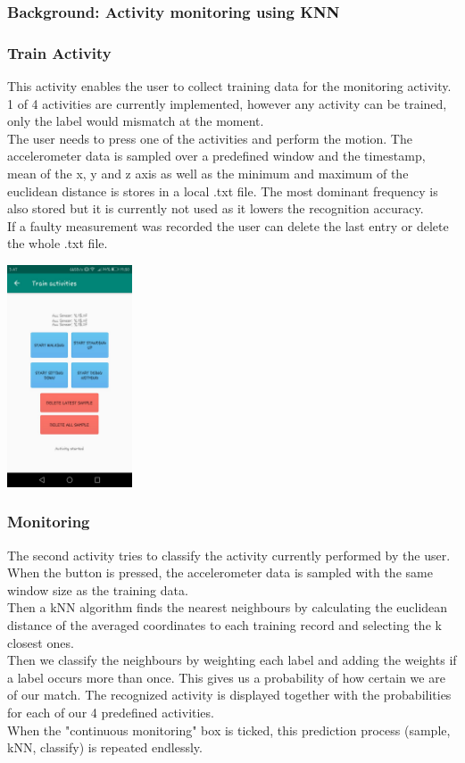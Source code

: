 \documentclass[12pt]{article}
\begin{document}
\subsubsection{Background: Activity monitoring using KNN}

\subsubsection{Train Activity}
This activity enables the user to collect training data for the monitoring activity. 1 of 4 activities are currently implemented, however any activity can be trained, only the label would mismatch at the moment.
\\
The user needs to press one of the activities and perform the motion. The accelerometer data is sampled over a predefined window and the timestamp, mean of the x, y and z axis as well as the minimum and maximum of the euclidean distance is stores in a local .txt file. The most dominant frequency is also stored but it is currently not used as it lowers the recognition accuracy.
\\
If a faulty measurement was recorded the user can delete the last entry or delete the whole .txt file.

\begin{center}
  \includegraphics[width=140px]{images/train_activity}
\end{center}

\pagebreak

\subsubsection{Monitoring}


The second activity tries to classify the activity currently performed by the user. When the button is pressed, the accelerometer data is sampled with the same window size as the training data. 
\\
Then a kNN algorithm finds the nearest neighbours by calculating the euclidean distance of the averaged coordinates to each training record and selecting the k closest ones. 
\\
Then we classify the neighbours by weighting each label and adding the weights if a label occurs more than once. This gives us a probability of how certain we are of our match. The recognized activity is displayed together with the probabilities for each of our 4 predefined activities.
\\
When the "continuous monitoring" box is ticked, this prediction process (sample, kNN, classify) is repeated endlessly.
\end{document}
